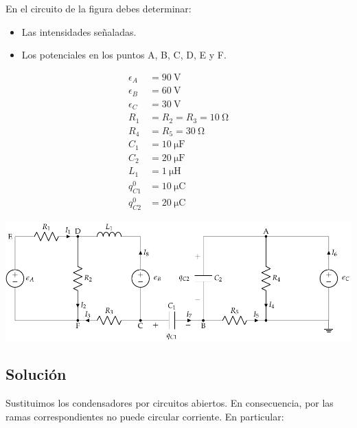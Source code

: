 \documentclass[10pt]{article}
\begin{document}
\clearpage

\section{}

En el circuito de la figura debes determinar:
\begin{itemize}
\item Las intensidades señaladas.
\item Los potenciales en los puntos A, B, C, D, E y F.
\end{itemize}


\begin{minipage}[c]{0.2\linewidth}
  \begin{align*}
    \epsilon_{A}&=\SI{90}{\volt}\\
    \epsilon_{B}&=\SI{60}{\volt}\\
    \epsilon_{C}&=\SI{30}{\volt}\\
    R_{1}&= R_2 = R_3 = \SI{10}{\ohm}\\
    R_{4}&= R_5 = \SI{30}{\ohm}\\
    C_{1}&= \SI{10}{\micro\farad}\\
    C_{2}&= \SI{20}{\micro\farad}\\
    L_1 &= \SI{1}{\micro\henry}\\
    q^0_{C1} &= \SI{10}{\micro\coulomb}\\
    q^0_{C2} &= \SI{20}{\micro\coulomb}
  \end{align*}
\end{minipage}
\begin{minipage}[c]{0.8\linewidth}
  \includegraphics[scale = 0.8]{../figs/mallas_carga_inicial.pdf}
\end{minipage}

\subsection*{Solución}

Sustituimos los condensadores por circuitos abiertos. En consecuencia, por las ramas correspondientes no puede circular corriente. En particular:
\end{document}
